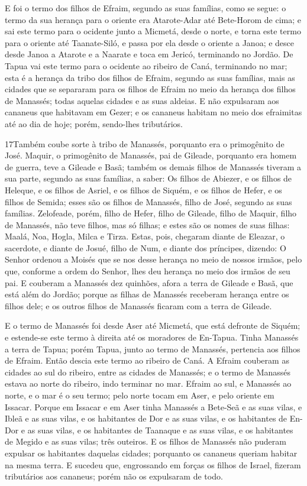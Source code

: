 E foi o termo dos filhos de Efraim, segundo as suas famílias, como
se segue: o termo da sua herança para o oriente era Atarote-Adar até
Bete-Horom de cima; e sai este termo para o ocidente junto a
Micmetá, desde o norte, e torna este termo para o oriente até
Taanate-Siló, e passa por ela desde o oriente a Janoa; e desce
desde Janoa a Atarote e a Naarate e toca em Jericó, terminando no
Jordão. De Tapua vai este termo para o ocidente ao ribeiro de
Caná, terminando no mar; esta é a herança da tribo dos filhos de
Efraim, segundo as suas famílias, mais as cidades que se
separaram para os filhos de Efraim no meio da herança dos filhos de
Manassés; todas aquelas cidades e as suas aldeias. E não
expulsaram aos cananeus que habitavam em Gezer; e os cananeus
habitam no meio dos efraimitas até ao dia de hoje; porém, sendo-lhes
tributários.

\medskip

\lettrine{17} Também coube sorte à tribo de Manassés,
porquanto era o primogênito de José. Maquir, o primogênito de
Manassés, pai de Gileade, porquanto era homem de guerra, teve a
Gileade e Basã; também os demais filhos de Manassés tiveram a
sua parte, segundo as suas famílias, a saber: Os filhos de Abiezer,
e os filhos de Heleque, e os filhos de Asriel, e os filhos de
Siquém, e os filhos de Hefer, e os filhos de Semida; esses são os
filhos de Manassés, filho de José, segundo as suas famílias.
Zelofeade, porém, filho de Hefer, filho de Gileade, filho de
Maquir, filho de Manassés, não teve filhos, mas só filhas; e estes
são os nomes de suas filhas: Maalá, Noa, Hogla, Milca e Tirza.
Estas, pois, chegaram diante de Eleazar, o sacerdote, e diante
de Josué, filho de Num, e diante dos príncipes, dizendo: O Senhor
ordenou a Moisés que se nos desse herança no meio de nossos irmãos,
pelo que, conforme a ordem do Senhor, lhes deu herança no meio dos
irmãos de seu pai. E couberam a Manassés dez quinhões, afora a
terra de Gileade e Basã, que está além do Jordão; porque as
filhas de Manassés receberam herança entre os filhos dele; e os
outros filhos de Manassés ficaram com a terra de Gileade.

E o termo de Manassés foi desde Aser até Micmetá, que está
defronte de Siquém; e estende-se este termo à direita até os
moradores de En-Tapua. Tinha Manassés a terra de Tapua; porém
Tapua, junto ao termo de Manassés, pertencia aos filhos de Efraim.
Então descia este termo ao ribeiro de Caná. A Efraim couberam as
cidades ao sul do ribeiro, entre as cidades de Manassés; e o termo
de Manassés estava ao norte do ribeiro, indo terminar no mar.
Efraim ao sul, e Manassés ao norte, e o mar é o seu termo;
pelo norte tocam em Aser, e pelo oriente em Issacar. Porque
em Issacar e em Aser tinha Manassés a Bete-Seã e as suas vilas, e
Ibleã e as suas vilas, e os habitantes de Dor e as suas vilas, e os
habitantes de En-Dor e as suas vilas, e os habitantes de Taanaque e
as suas vilas, e os habitantes de Megido e as suas vilas; três
outeiros. E os filhos de Manassés não puderam expulsar os
habitantes daquelas cidades; porquanto os cananeus queriam habitar
na mesma terra. E sucedeu que, engrossando em forças os
filhos de Israel, fizeram tributários aos cananeus; porém não os
expulsaram de todo.

